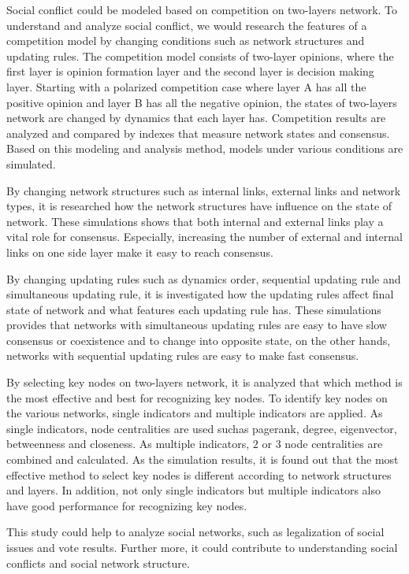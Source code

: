 
\begin{bigabstract}
Social conflict could be modeled based on competition on two-layers network. To understand and analyze social conflict, we would research the features of a competition model by changing conditions such as network structures and updating rules. The competition model consists of two-layer opinions, where the first layer is opinion formation layer and the second layer is decision making layer. Starting with a polarized competition case where layer A has all the positive opinion and layer B has all the negative opinion, the states of two-layers network are changed by dynamics that each layer has. Competition results are analyzed and compared by indexes that measure network states and consensus. Based on this modeling and analysis method, models under various conditions are simulated.  

By changing network structures such as internal links, external links and network types, it is researched how the network structures have influence on the state of network. These simulations shows that both internal and external links play a vital role for consensus. Especially, increasing the number of external and internal links on one side layer make it easy to reach consensus.

By changing updating rules such as dynamics order, sequential updating rule and simultaneous updating rule, it is investigated how the updating rules affect final state of network and what features each updating rule has. These simulations provides that networks with simultaneous updating rules are easy to have slow consensus or coexistence and to change into opposite state, on the other hands, networks with sequential updating rules are easy to make fast consensus.

By selecting key nodes on two-layers network, it is analyzed that which method is the most effective and best for recognizing key nodes. To identify key nodes on the various networks, single indicators and multiple indicators are applied. As single indicators, node centralities are used suchas pagerank, degree, eigenvector, betweenness and closeness. As multiple indicators, $2$ or $3$ node centralities are combined and calculated. As the simulation results, it is found out that the most effective method to select key nodes is different according to network structures and layers. In addition, not only single indicators but multiple indicators also have good performance for recognizing key nodes.

This study could help to analyze social networks, such as legalization of social issues and vote results. Further more, it could contribute to understanding social conflicts and social network structure.\\
\end{bigabstract}